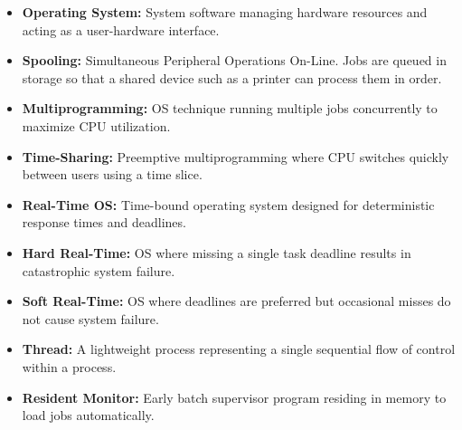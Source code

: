 \documentclass[12pt,a4paper]{article}
\begin{document}
\begin{tcolorbox}[defbox, title={\textbf{One-Line Definitions}}]
\begin{itemize}[leftmargin=*, itemsep=2.5pt, topsep=0pt]
  \item \textbf{Operating System:} System software managing hardware resources and acting as a user-hardware interface.
  \item \textbf{Spooling:} Simultaneous Peripheral Operations On-Line. Jobs are queued in storage so that a shared device such as a printer can process them in order.
  \item \textbf{Multiprogramming:} OS technique running multiple jobs concurrently to maximize CPU utilization.
  \item \textbf{Time-Sharing:} Preemptive multiprogramming where CPU switches quickly between users using a time slice.
  \item \textbf{Real-Time OS:} Time-bound operating system designed for deterministic response times and deadlines.
  \item \textbf{Hard Real-Time:} OS where missing a single task deadline results in catastrophic system failure.
  \item \textbf{Soft Real-Time:} OS where deadlines are preferred but occasional misses do not cause system failure.
  \item \textbf{Thread:} A lightweight process representing a single sequential flow of control within a process.
  \item \textbf{Resident Monitor:} Early batch supervisor program residing in memory to load jobs automatically.
\end{itemize}
\end{tcolorbox}
\end{document}
